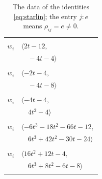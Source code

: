 \documentclass[11pt]{article}
\begin{document}
\begingroup\scriptsize
\setlength{\LTcapwidth}{\textwidth}
\begin{longtable}{@{}ll@{}}
\caption{The data of the identities \eqref{eq:starlin}; the entry $j{:}e$ means $\rho_{ij}=e\neq0$.}\label{tab:star}\\
\hline\endfirsthead\hline\endhead\hline\endfoot
\multicolumn{2}{@{}p{0.97\textwidth}@{}}{$i=0$, $D_i=1$, $\rho_{ij}$: $5{:}1, \allowbreak 8{:}2, \allowbreak 10{:}1, \allowbreak 14{:}1, \allowbreak 16{:}1, \allowbreak 24{:}2, \allowbreak 30{:}1$}\\
$w_i$ & $\langle 2t-12,$\\
 & $\quad -4t-4\rangle$\\
\addlinespace[2pt]
\multicolumn{2}{@{}p{0.97\textwidth}@{}}{$i=1$, $D_i=1$, $\rho_{ij}$: $3{:}1, \allowbreak 5{:}1, \allowbreak 7{:}1, \allowbreak 9{:}1, \allowbreak 10{:}1, \allowbreak 29{:}2, \allowbreak 33{:}1, \allowbreak 35{:}1$}\\
$w_i$ & $\langle -2t-4,$\\
 & $\quad -4t-8\rangle$\\
\addlinespace[2pt]
\multicolumn{2}{@{}p{0.97\textwidth}@{}}{$i=2$, $D_i=1$, $\rho_{ij}$: $5{:}2, \allowbreak 8{:}1, \allowbreak 10{:}2, \allowbreak 13{:}1, \allowbreak 14{:}2, \allowbreak 15{:}2, \allowbreak 30{:}2, \allowbreak 32{:}1, \allowbreak 33{:}2, \allowbreak 34{:}1$}\\
$w_i$ & $\langle -4t-4,$\\
 & $\quad 4t^{2}-4\rangle$\\
\addlinespace[2pt]
\multicolumn{2}{@{}p{0.97\textwidth}@{}}{$i=3$, $D_i=1$, $\rho_{ij}$: $1{:}2, \allowbreak 4{:}2, \allowbreak 12{:}1, \allowbreak 16{:}1, \allowbreak 19{:}1, \allowbreak 30{:}2, \allowbreak 34{:}1$}\\
$w_i$ & $\langle -6t^{3}-18t^{2}-66t-12,$\\
 & $\quad 6t^{3}+42t^{2}-30t-24\rangle$\\
\addlinespace[2pt]
\multicolumn{2}{@{}p{0.97\textwidth}@{}}{$i=4$, $D_i=1$, $\rho_{ij}$: $3{:}1, \allowbreak 11{:}1, \allowbreak 16{:}2, \allowbreak 20{:}1, \allowbreak 25{:}2, \allowbreak 26{:}1, \allowbreak 31{:}1$}\\
$w_i$ & $\langle 16t^{2}+12t-4,$\\
 & $\quad 6t^{3}+8t^{2}-6t-8\rangle$\\
\addlinespace[2pt]
\multicolumn{2}{@{}p{0.97\textwidth}@{}}{$i=5$, $D_i=1$, $\rho_{ij}$: $0{:}2, \allowbreak 1{:}2, \allowbreak 2{:}1, \allowbreak 7{:}1, \allowbreak 9{:}2, \allowbreak 10{:}1, \allowbreak 12{:}1, \allowbreak 13{:}2, \allowbreak 14{:}2, \allowbreak 18{:}1, \allowbreak 25{:}1, \allowbreak 32{:}1$}\\

\end{longtable}
\end{document}
